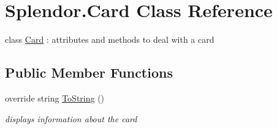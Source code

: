 \hypertarget{class_splendor_1_1_card}{}\section{Splendor.\+Card Class Reference}
\label{class_splendor_1_1_card}


class \hyperlink{class_splendor_1_1_card}{Card} \+: attributes and methods to deal with a card  


\subsection*{Public Member Functions}
\begin{DoxyCompactItemize}
\item 
override string \hyperlink{class_splendor_1_1_card_a3403c28ee02b119ee5aae5bd10eee468}{To\+String} ()
\begin{DoxyCompactList}\small\item\em displays information about the card \end{DoxyCompactList}\end{DoxyCompactItemize}
